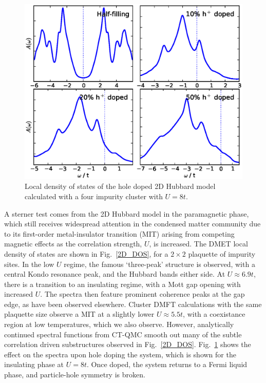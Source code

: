 \documentclass[aps,showpacs,twocolumn,nobibnotes]{revtex4}
\begin{document}
\begin{figure}
\begin{center}
    \vspace{-2mm}
\includegraphics[scale=0.475]{Plots/Doping/2D/nImp4/U8/LargerBroadening/2DHub_Doping.eps}
\end{center}
    \vspace{-8mm}
\caption{Local density of states of the hole doped 2D Hubbard model calculated with a four impurity cluster with $U = 8t$.}
\label{2D_Doped}
\end{figure}

A sterner test comes from the 2D Hubbard model in the paramagnetic phase, which still receives widespread attention in the condensed matter community\cite{Georges1996,Senechal2000,Kotliar2008,Millis2012,Millis2013}
due to its first-order metal-insulator transition (MIT) arising from competing magnetic effects as the correlation strength, $U$, is increased. The DMET local density of
states are shown in Fig.~\ref{2D_DOS}, for a $2 \times 2$ plaquette of impurity sites. In the low $U$ regime, the famous `three-peak' structure is observed, with a central 
Kondo resonance peak, and the Hubbard bands either side. At $U \approx 6.9t$, there is a transition to an insulating regime, with a Mott gap opening with increased
$U$. The spectra then feature prominent coherence peaks at the gap edge, as have been observed elsewhere. Cluster DMFT calculations with the same plaquette
size observe a MIT at a slightly lower $U\approx5.5t$, with a coexistance region at low temperatures, which we also observe\cite{Kotliar2008}. However, analytically continued
spectral functions from CT-QMC smooth out many of the subtle correlation driven substructures observed in Fig.~\ref{2D_DOS}. Fig.~\ref{2D_Doped} shows the effect on the 
spectra upon hole doping the system, which is shown for the insulating phase at $U=8t$. Once doped, the system returns to a Fermi liquid phase, and 
particle-hole symmetry is broken.
\end{document}
